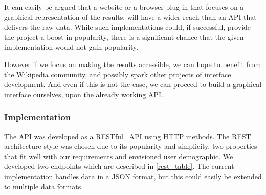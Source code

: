 It can easily be argued that a website or a browser plug-in that focuses on a graphical representation of the results, will have a wider reach than an API that delivers the raw data. While such implementations could, if successful, provide the project a boost in popularity, there is a significant chance that the given implementation would not gain popularity.

However if we focus on making the results accessible, we can hope to benefit from the Wikipedia community, and possibly spark other projects of interface development. And even if this is not the case, we can proceed to build a graphical interface ourselves, upon the already working API\@.

\subsubsection{Implementation}

The API was developed as a RESTful~\cite{rest} API using HTTP methods. The REST architecture style was chosen due to its popularity and simplicity, two properties that fit well with our requirements and envisioned user demographic. We developed two endpoints which are described in \cref{rest_table}. The current implementation handles data in a JSON format, but this could easily be extended to multiple data formats.


